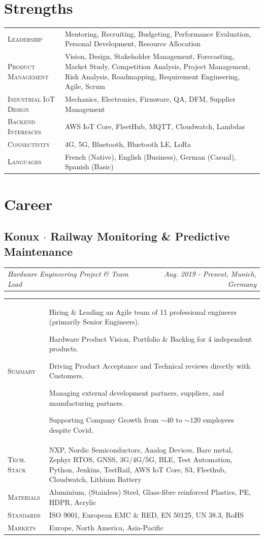 \documentclass[10pt,a4paper]{moderncv}
\newcommand*{\makecareersubsection}[5]{
  \subsection{#1 {\color{color2}$\cdot$ #2}}
  \addvspace{-0.5em}
  {\color{color2}
  \begin{tabularx}{\textwidth}{LR}
    {\itshape #3} & {\itshape #4, #5}
  \end{tabularx}}
  \par\addvspace{1em}
  }
\begin{document}
\section{Strengths}

  \begin{tabularx}{\textwidth}{>{\scshape}l@{\hskip 3.5mm}L}
    Leadership & Mentoring, Recruiting, Budgeting, Performance Evaluation, Personal Development, Resource Allocation\\
    Product Management & Vision, Design, Stakeholder Management, Forecasting, Market Study, Competition Analysis, Project Management, Risk Analysis, Roadmapping, Requirement Engineering, Agile, Scrum\\
    Industrial IoT Design & Mechanics, Electronics, Firmware, QA, DFM, Supplier Management\\
    Backend Interfaces & AWS IoT Core, FleetHub, MQTT, Cloudwatch,  Lambdas\\
    Connectivity & 4G, 5G, Bluetooth, Bluetooth LE, LoRa\\
    Languages & French (Native), English (Business), German (Casual), Spanish (Basic)
  \end{tabularx}

\section{Career}

\makecareersubsection{Konux}{Railway Monitoring \& Predictive Maintenance}
  {Hardware Engineering Project \& Team Lead}
  {Aug. 2019 - Present}
  {Munich, Germany}

  \begin{tabularx}{\textwidth}{>{\scshape}l@{\hskip 3.5mm}L}
    Summary & Hiring \& Leading an Agile team of 11 professional engineers (primarily Senior Engineers).
    \par Hardware Product Vision, Portfolio \& Backlog for 4 independent products.
    \par Driving Product Acceptance and Technical reviews directly with Customers.
    \par Managing external development partners, suppliers, and manufacturing partners.
    \par Supporting Company Growth from $\sim 40$ to $\sim 120$ employees despite Covid.\\
    Tech. Stack & NXP, Nordic Semiconductors, Analog Devices, Bare metal, Zephyr RTOS, GNSS, 3G/4G/5G, BLE, Test Automation, Python, Jenkins, TestRail, AWS IoT Core, S3, Fleethub, Cloudwatch, Lithium Battery\\
    Materials &  Aluminium, (Stainless) Steel, Glass-fibre reinforced Plastics, PE, HDPR, Acrylic\\
    Standards & ISO 9001, European EMC \& RED, EN 50125, UN 38.3, RoHS\\
    Markets & Europe, North America, Asia-Pacific\\
  \end{tabularx}
\end{document}
